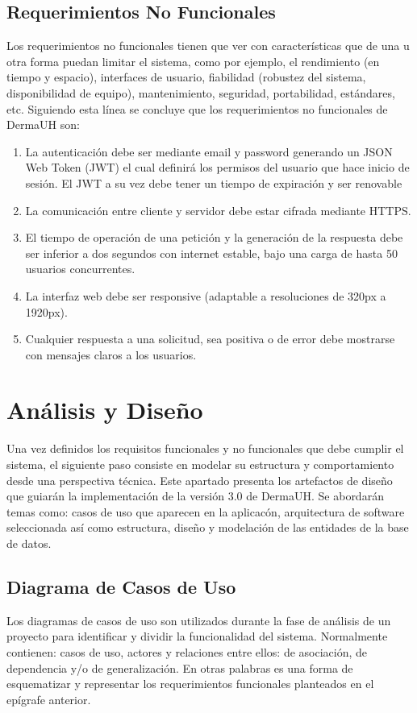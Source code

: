 \subsection{Requerimientos No Funcionales}
Los requerimientos no funcionales tienen que ver con características que de una u otra
forma puedan limitar el sistema, como por ejemplo, el rendimiento (en tiempo y espacio), interfaces de
usuario, fiabilidad (robustez del sistema, disponibilidad de equipo), mantenimiento, seguridad,
portabilidad, estándares, etc. Siguiendo esta l\'inea se concluye que los requerimientos no funcionales
de DermaUH son:
\begin{enumerate}
    \item[RNF1] La autenticaci\'on debe ser mediante email y password generando un JSON Web Token (JWT) el cual definir\'a los permisos del usuario que hace inicio de sesi\'on. El JWT a su vez debe tener un tiempo de expiraci\'on y ser renovable 
    \item[RNF2] La comunicación entre cliente y servidor debe estar cifrada mediante HTTPS.
    \item[RNF3] El tiempo de operaci\'on de una petici\'on y la generaci\'on de la respuesta debe ser inferior a dos segundos con internet estable, bajo una carga de hasta 50 usuarios concurrentes.
    \item[RNF4] La interfaz web debe ser responsive (adaptable a resoluciones de 320px a 1920px).
    \item[RNF5] Cualquier respuesta a una solicitud, sea positiva o de error debe mostrarse con mensajes claros a los usuarios.
\end{enumerate}

\section{Análisis y Diseño}

Una vez definidos los requisitos funcionales y no funcionales que debe cumplir el sistema, 
el siguiente paso consiste en modelar su estructura y comportamiento desde una perspectiva técnica. 
Este apartado presenta los artefactos de diseño que guiarán la implementación de la versión 3.0 de 
DermaUH. Se abordar\'an temas como: casos de uso que aparecen en la aplicac\'on, arquitectura 
de software seleccionada así como estructura, dise\~no y modelaci\'on de las entidades de 
la base de datos. 

\subsection{Diagrama de Casos de Uso}
Los diagramas de casos de uso son utilizados durante la fase de análisis de un proyecto para
identificar y dividir la funcionalidad del sistema. Normalmente contienen: casos de uso,
actores y relaciones entre ellos: de asociación, de dependencia y/o de generalización\cite{diagramaUML}. 
En otras palabras es una forma de esquematizar y representar los requerimientos funcionales planteados
en el ep\'igrafe anterior.

